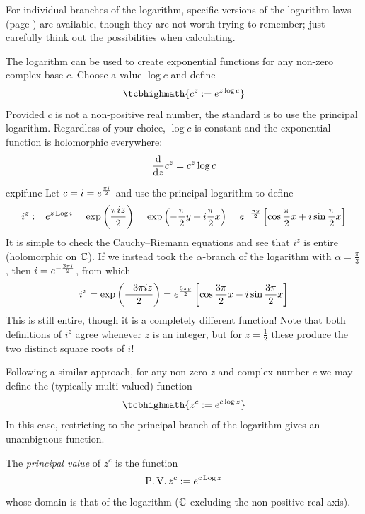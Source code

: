 For individual branches of the logarithm, specific versions of the logarithm laws (page \pageref{sec:loglaws}) are available, though they are not worth trying to remember; just carefully think out the possibilities when calculating.




The logarithm can be used to create exponential functions for any non-zero complex base $c$. Choose a value $\log c$ and define
\[
	\tcbhighmath{c^z:=e^{z\log c}}
\]
Provided $c$ is not a non-positive real number, the standard is to use the principal logarithm. Regardless of your choice, $\log c$ is constant and the exponential function is holomorphic everywhere:
\[
	\frac{\mathrm{d} }{\mathrm{d} z}c^z=c^z\log c
\]

\begin{example}{}{expifunc}
	Let $c=i=e^{\frac{\pi i}{2}}$ and use the principal logarithm to define
	\[
		i^z:=e^{z\operatorname{Log} i}=\exp\left(\frac{\pi iz}2\right) =\exp\left(-\frac\pi 2y+i\frac\pi 2x\right) =e^{-\frac{\pi y}{2}}\left[\cos\frac\pi 2x+i\sin\frac\pi 2x\right]
	\]
	It is simple to check the Cauchy--Riemann equations and see that $i^z$ is entire (holomorphic on $\mathbb{C}$).\smallbreak
	If we instead took the $\alpha$-branch of the logarithm with $\alpha=\frac\pi 3$, then $i=e^{-\frac{3\pi i}{2}}$, from which
	\[
		i^z=\exp\left(\frac{-3\pi iz}2\right) =e^{\frac{3\pi y}{2}}\left[\cos\frac{3\pi}2x-i\sin\frac{3\pi}2x\right]
	\]
	This is still entire, though it is a completely different function! Note that both definitions of $i^z$ agree whenever $z$ is an integer, but for $z=\frac 12$ these produce the two distinct square roots of $i$!
\end{example}

\goodbreak




Following a similar approach, for any non-zero $z$ and complex number $c$ we may define the (typically multi-valued) function
\[
	\tcbhighmath{z^c:=e^{c\log z}}
\]
In this case, restricting to the principal branch of the logarithm gives an unambiguous function.

\begin{defn}{}{}
	The \emph{principal value} of $z^c$ is the function
	\[
		\operatorname{P.V.}z^c:=e^{c\operatorname{Log} z}
	\]
	whose domain is that of the logarithm ($\mathbb{C}$ excluding the non-positive real axis).
\end{defn}




